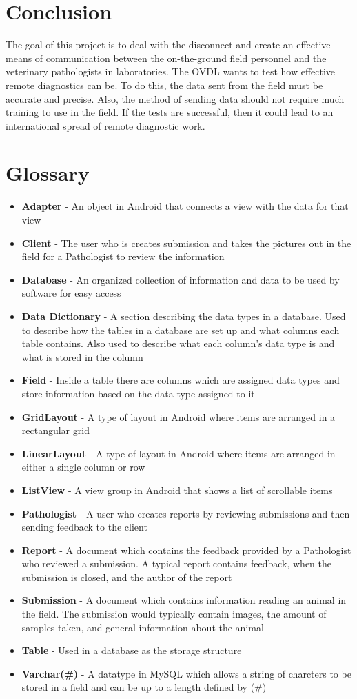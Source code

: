 \documentclass[onecolumn, draftclsnofoot, article, 10pt, compsoc]{IEEEtran}
\begin{document}
\section{Conclusion}
The goal of this project is to deal with the disconnect and create an effective means of communication between the on-the-ground field personnel and the veterinary pathologists in laboratories. The OVDL wants to test how effective remote diagnostics can be. To do this, the data sent from the field must be accurate and precise. Also, the method of sending data should not require much training to use in the field. If the tests are successful, then it could lead to an international spread of remote diagnostic work. 

\section{Glossary}
\begin{itemize}
\item \textbf{Adapter} - An object in Android that connects a view with the data for that view
\item \textbf{Client} - The user who is creates submission and takes the pictures out in the field for a Pathologist to review the information
\item \textbf{Database} - An organized collection of information and data to be used by software for easy access
\item \textbf{Data Dictionary} - A section describing the data types in a database. Used to describe how the tables in a database are set up and what columns each table contains. Also used to describe what each column's data type is and what is stored in the column
\item \textbf{Field} - Inside a table there are columns which are assigned data types and store information based on the data type assigned to it 
\item \textbf{GridLayout} - A type of layout in Android where items are arranged in a rectangular grid
\item \textbf{LinearLayout} - A type of layout in Android where items are arranged in either a single column or row
\item \textbf{ListView} - A view group in Android that shows a list of scrollable items
\item \textbf{Pathologist} - A user who creates reports by reviewing submissions and then sending feedback to the client
\item \textbf{Report} - A document which contains the feedback provided by a Pathologist who reviewed a submission. A typical report contains feedback, when the submission is closed, and the author of the report
\item \textbf{Submission} - A document which contains information reading an animal in the field. The submission would typically contain images, the amount of samples taken, and general information about the animal
\item \textbf{Table} - Used in a database as the storage structure
\item \textbf{Varchar(\#)} - A datatype in MySQL which allows a string of charcters to be stored in a field and can be up to a length defined by (\#)
\end{itemize}
\end{document}
